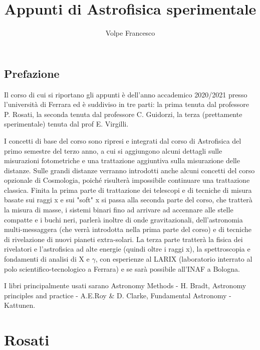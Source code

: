 \documentclass[a4paper,twoside,openany,notitlepage]{book}
\newcommand{\mail}[1]{\href{mailto:#1}{\nolinkurl{#1}}}
\theoremstyle{definition}
\theoremstyle{plain}
\begin{document}
\frontmatter
\author{Volpe Francesco}
\title{Appunti di Astrofisica sperimentale}
\date{}
\maketitle

\pagestyle{plain}
\tableofcontents

\chapter*{Prefazione}

Il corso di cui si riportano gli appunti è dell'anno accademico 2020/2021 presso l'università di Ferrara ed è suddiviso in tre parti: la prima tenuta dal professore P. Rosati, la seconda tenuta dal professore C. Guidorzi, la terza (prettamente sperimentale) tenuta dal prof E. Virgilli.

I concetti di base del corso sono ripresi e integrati dal corso di Astrofisica del primo semestre del terzo anno, a cui si aggiungono alcuni dettagli sulle misurazioni fotometriche e una trattazione aggiuntiva sulla misurazione delle distanze. Sulle grandi distanze verranno introdotti anche alcuni concetti del corso opzionale di Cosmologia, poiché risulterà impossibile continuare una trattazione classica. Finita la prima parte di trattazione dei telescopi e di tecniche di misura basate sui raggi x e sui "soft" x si passa alla seconda parte del corso, che tratterà la misura di masse, i sistemi binari fino ad arrivare ad accennare alle stelle compatte e i buchi neri, parlerà inoltre di onde gravitazionali, dell'astronomia multi-messaggera (che verrà introdotta nella prima parte del corso) e di tecniche di rivelazione di nuovi pianeti extra-solari. La terza parte tratterà la fisica dei rivelatori e l'astrofisica ad alte energie (quindi oltre i raggi x), la spettroscopia e fondamenti di analisi di X e $\gamma$, con esperienze al LARIX (laboratorio interrato al polo scientifico-tecnologico a Ferrara) e se sarà possibile all'INAF a Bologna.

I libri principalmente usati sarano Astronomy Methods - H. Bradt, Astronomy principles and practice - A.E.Roy \& D. Clarke, Fundamental Astronomy - Kattunen.

\mainmatter

\part{Rosati}
\end{document}
